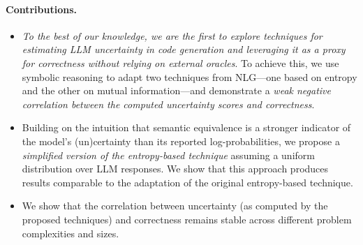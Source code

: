 \paragraph{Contributions.}
\begin{itemize}[leftmargin=*]
    \item \emph{To the best of our knowledge, we are the first to explore techniques for estimating LLM uncertainty in code generation and leveraging it as a proxy for correctness without relying on external oracles}. To achieve this, we use symbolic reasoning to adapt two techniques from NLG—one based on entropy and the other on mutual information—and demonstrate a \emph{weak negative correlation between the computed uncertainty scores and correctness}.
    \item Building on the intuition that semantic equivalence is a stronger indicator of the model's (un)certainty than its reported log-probabilities, we propose a \emph{simplified version of the entropy-based technique} assuming a uniform distribution over LLM responses. 
        We show that this approach produces results comparable to the adaptation of the original entropy-based technique.



    \item We show that the correlation between uncertainty (as computed by the proposed techniques) and correctness remains stable across different problem complexities and sizes.      


\end{itemize}

